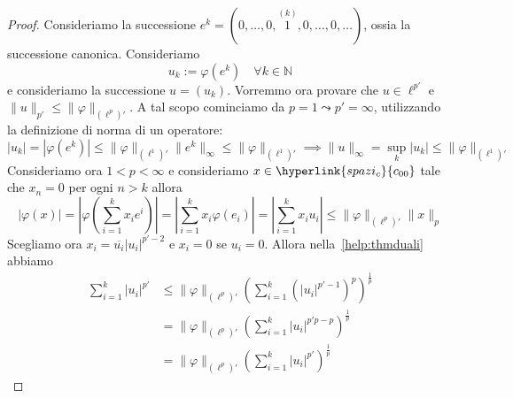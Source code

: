 \begin{proof}
    Consideriamo la successione \(e^{k} = {(0, \dots, 0,  \overset{(k)}{1}, 0,
    \dots, 0, \dots)}\), ossia la successione canonica. Consideriamo 
    \[u_k := \varphi {(e^{k})} \quad \forall k \in \mathbb{N}\] 
    e consideriamo la successione \(u = {(u_k)}\). Vorremmo ora provare che \(u
    \in \ell^{p'}\) e \(\|u\|_{p'} \le \|\varphi \|_{{(\ell^{p})}'} \). A tal
    scopo cominciamo da \(p =1 \leadsto p' = \infty\), utilizzando la definizione di norma di un operatore:
    \[
      |u_k| = |\varphi {(e^{k})}| \le \|\varphi\|_{{(\ell^{1})}'}
      \|e^{k}\|_{\infty} \le \|\varphi \|_{{(\ell^{1})}'} \implies \|u\|_\infty
      = \sup_k |u_k| \le \|\varphi \|_{{(\ell^{1})}'}
    \]
    Consideriamo ora \(1 < p < \infty\) e consideriamo \(x \in
    \hyperlink{spazi_c}{c_{00}}\) tale che \(x_{n} = 0\) per ogni \(n > k\) 
    allora 
    \begin{equation}\label{help:thmduali}
      |\varphi {(x)}| = \left|  \varphi {\left( \sum_{i=1}^{k} x_{i} e^{i}  \right)}  \right|=
      \left| \sum_{i=1}^{k} x_{i} \varphi {(e_{i})}   \right|=\left|   \sum_{i=1}^{k} x_{i} u_{i}  \right|\le
      \|\varphi \|_{(\ell^{p})'} \|x\|_p
    \end{equation}
    Scegliamo ora \(x_{i} = \overline{u_i} |u_{i}|^{p'-2} \) e \(x_{i} = 0\) se \(u_{i} =
    0\). Allora nella~\eqref{help:thmduali} abbiamo
    \[
    \begin{aligned}
        \sum_{i=1}^{k} |u_{i}|^{p'} 
        &\le \|\varphi\|_{(\ell^{p})'} 
        \left( \sum_{i=1}^{k} \left( |u_{i}|^{p'-1} \right)^{p}
        \right)^{\frac{1}{p}} \\
        &= \|\varphi\|_{(\ell^{p})'} \left( \sum_{i=1}^{k} |u_{i}|^{p'p - p}
        \right)^{\frac{1}{p}} \\
        &= \|\varphi\|_{(\ell^{p})'} \left( \sum_{i=1}^{k} |u_{i}|^{p'}
        \right)^{\frac{1}{p}}
    \end{aligned} 
\]


\end{proof}
